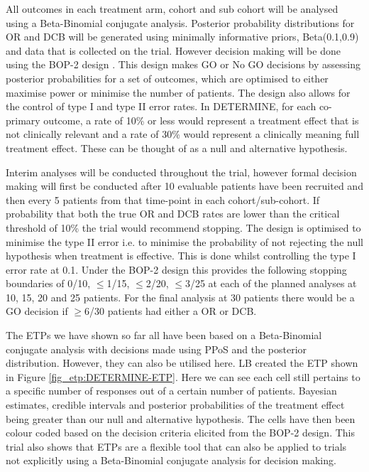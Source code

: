 All outcomes in each treatment arm, cohort and sub cohort will be analysed using a Beta-Binomial conjugate analysis. Posterior probability distributions for OR and DCB will be generated using minimally informative priors, Beta(0.1,0.9) and data that is collected on the trial. However decision making will be done using the BOP-2 design \cite{zhouBOP2BayesianOptimal2017}. This design makes GO or No GO decisions by assessing posterior probabilities for a set of outcomes, which are optimised to either maximise power or minimise the number of patients. The design also allows for the control of type I and type II error rates. In DETERMINE, for each co-primary outcome, a rate of 10\% or less would represent a treatment effect that is not clinically relevant and a rate of 30\% would represent a clinically meaning full treatment effect. These can be thought of as a null and alternative hypothesis. 

Interim analyses will be conducted throughout the trial, however formal decision making will first be conducted after 10 evaluable patients have been recruited and then every 5 patients from that time-point in each cohort/sub-cohort. If probability that both the true OR and DCB rates are lower than the critical threshold of 10\% the trial would recommend stopping. The design is optimised to minimise the type II error i.e. to minimise the probability of not rejecting the null hypothesis when treatment is effective. This is done whilst controlling the type I error rate at 0.1. Under the BOP-2 design this provides the following stopping boundaries of 0/10, $\leq$1/15, $\leq$2/20, $\leq$3/25 at each of the planned analyses at 10, 15, 20 and 25 patients. For the final analysis at 30 patients there would be a GO decision if $\geq$6/30 patients had either a OR or DCB.   

The ETPs we have shown so far all have been based on a Beta-Binomial conjugate analysis with decisions made using PPoS and the posterior distribution. However, they can also be utilised here. LB created the ETP shown in Figure \ref{fig_etp:DETERMINE-ETP}. Here we can see each cell still pertains to a specific number of responses out of a certain number of patients. Bayesian estimates, credible intervals and posterior probabilities of the treatment effect being greater than our null and alternative hypothesis. The cells have then been colour coded based on the decision criteria elicited from the BOP-2 design. This trial also shows that ETPs are a flexible tool that can also be applied to trials not explicitly using a Beta-Binomial conjugate analysis for decision making. 


